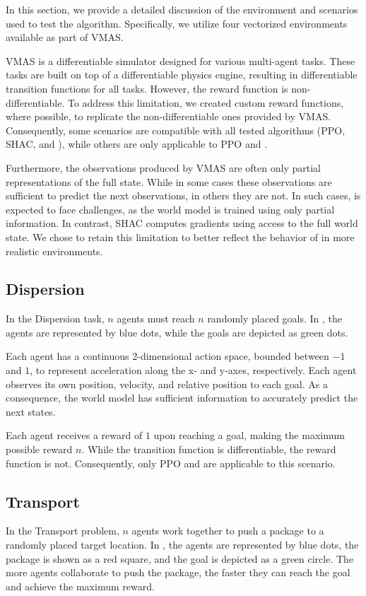 In this section, we provide a detailed discussion of the environment and scenarios used to test the \fname{} algorithm. Specifically, we utilize four vectorized environments available as part of VMAS.

VMAS is a differentiable simulator designed for various multi-agent tasks. These tasks are built on top of a differentiable physics engine, resulting in differentiable transition functions for all tasks. However, the reward function is non-differentiable. To address this limitation, we created custom reward functions, where possible, to replicate the non-differentiable ones provided by VMAS. Consequently, some scenarios are compatible with all tested algorithms (PPO, SHAC, and \fname{}), while others are only applicable to PPO and \fname{}.

Furthermore, the observations produced by VMAS are often only partial representations of the full state. While in some cases these observations are sufficient to predict the next observations, in others they are not. In such cases, \fname{} is expected to face challenges, as the world model is trained using only partial information. In contrast, SHAC computes gradients using access to the full world state. We chose to retain this limitation to better reflect the behavior of \fname{} in more realistic environments.

\subsection{Dispersion}
In the Dispersion task, $n$ agents must reach $n$ randomly placed goals. In , the agents are represented by blue dots, while the goals are depicted as green dots.

Each agent has a continuous 2-dimensional action space, bounded between $-1$ and $1$, to represent acceleration along the x- and y-axes, respectively. Each agent observes its own position, velocity, and relative position to each goal. As a consequence, the world model has sufficient information to accurately predict the next states.

Each agent receives a reward of $1$ upon reaching a goal, making the maximum possible reward $n$. While the transition function is differentiable, the reward function is not. Consequently, only PPO and \fname{} are applicable to this scenario.

\subsection{Transport}
In the Transport problem, $n$ agents work together to push a package to a randomly placed target location. In , the agents are represented by blue dots, the package is shown as a red square, and the goal is depicted as a green circle. The more agents collaborate to push the package, the faster they can reach the goal and achieve the maximum reward.

